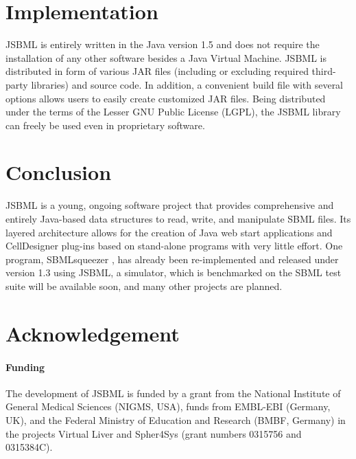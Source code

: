 \documentclass{bioinfo}
\begin{document}
\section{Implementation}

JSBML is entirely written in the Java\texttrademark{} version 1.5 and does
not require the installation of any other software besides a Java Virtual
Machine.
JSBML is distributed in form of various JAR files (including or excluding
required third-party libraries) and source code. In addition, a convenient build
file with several options allows users to easily create customized JAR files.
Being distributed under the terms of the Lesser GNU Public License (LGPL), the
JSBML library can freely be used even in proprietary software.



\section{Conclusion}

JSBML is a young, ongoing software project that
provides comprehensive and entirely Java-based data structures
to read, write, and manipulate SBML files. Its layered architecture
allows for the creation of Java web start applications and
CellDesigner plug-ins based on stand-alone programs with very
little effort.
%
One program, SBMLsqueezer \citep{Draeger2008}, has already been
re-implemented and released under version 1.3 using JSBML, a simulator, which is
benchmarked on the SBML test suite will be available soon, and
many other projects are planned.

\section*{Acknowledgement}

\paragraph{Funding\textcolon}
The development of JSBML is funded by a grant from the National Institute
of General Medical Sciences (NIGMS, USA), funds from EMBL-EBI (Germany, UK),
and the Federal Ministry of Education and Research (BMBF, Germany) in the
projects Virtual Liver and Spher4Sys (grant numbers 0315756 and 0315384C).
\end{document}
